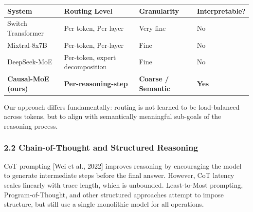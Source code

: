 {\def\LTcaptype{none} %
\begin{longtable}[]{@{}
  >{\raggedright\arraybackslash}p{}
  >{\raggedright\arraybackslash}p{}
  >{\raggedright\arraybackslash}p{}
  >{\raggedright\arraybackslash}p{}@{}}
\toprule\noalign{}
\begin{minipage}[b]{\linewidth}\raggedright
System
\end{minipage} & \begin{minipage}[b]{\linewidth}\raggedright
Routing Level
\end{minipage} & \begin{minipage}[b]{\linewidth}\raggedright
Granularity
\end{minipage} & \begin{minipage}[b]{\linewidth}\raggedright
Interpretable?
\end{minipage} \\
\midrule\noalign{}
\endhead
\bottomrule\noalign{}
\endlastfoot
Switch Transformer & Per-token, Per-layer & Very fine & No \\
Mixtral-8x7B & Per-token, Per-layer & Fine & No \\
DeepSeek-MoE & Per-token, expert decomposition & Fine & No \\
\textbf{Causal-MoE (ours)} & \textbf{Per-reasoning-step} &
\textbf{Coarse / Semantic} & \textbf{Yes} \\
\end{longtable}
}

Our approach differs fundamentally: routing is not learned to be
load-balanced across tokens, but to align with semantically meaningful
sub-goals of the reasoning process.

\subsubsection{2.2 Chain-of-Thought and Structured
Reasoning}\label{chain-of-thought-and-structured-reasoning}

CoT prompting {[}Wei et al., 2022{]} improves reasoning by encouraging
the model to generate intermediate steps before the final answer.
However, CoT latency scales linearly with trace length, which is
unbounded. Least-to-Most prompting, Program-of-Thought, and other
structured approaches attempt to impose structure, but still use a
single monolithic model for all operations.

